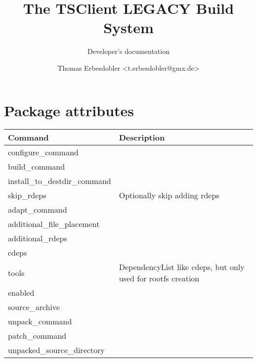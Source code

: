 \documentclass[a4paper]{scrartcl}
\title{The TSClient LEGACY Build System}
\subtitle{Developer's documentation}
\author{Thomas Erbesdobler <t.erbesdobler@gmx.de>}
\begin{document}
	\maketitle
	\tableofcontents
	
	\section{Package attributes}
	\label{sec:package_attributes}
	
	\begin{tabularx}{\textwidth}{lX}
		Command & Description \\
		\hline
		configure\_command & \\
		build\_command & \\
		install\_to\_destdir\_command & \\
		skip\_rdeps & Optionally skip adding rdeps \\
		adapt\_command & \\
		additional\_file\_placement & \\
		additional\_rdeps & \\
		cdeps & \\
		tools & DependencyList like cdeps, but only used for rootfs creation \\
		enabled & \\
		source\_archive & \\
		unpack\_command & \\
		patch\_command & \\
		unpacked\_source\_directory & \\
	\end{tabularx}
	
\end{document}

